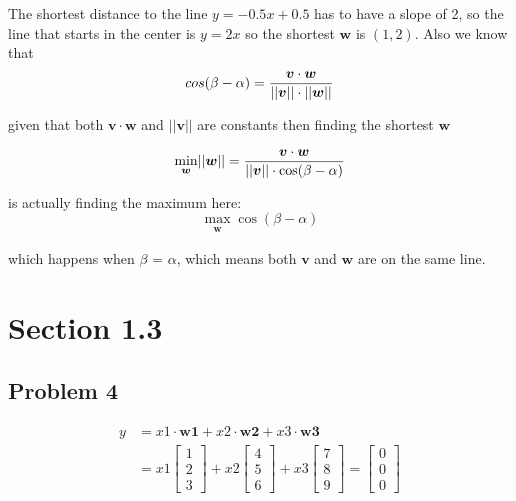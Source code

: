 \documentclass[a4paper,11pt]{article}
\newcommand{\mybf}[1]{\boldsymbol{#1}}
\newcommand{\norm}[1]{\lvert\lvert #1 \rvert\rvert}
\begin{document}
The shortest distance to the line $y=-0.5x+0.5$ has to have a slope of 2, so the line that starts in the center is $y=2x$ so the shortest $\mybf{w}$ is $(1,2)$. Also we know that
\begin{equation}
       cos(\beta-\alpha) = \frac{\mybf{v}\cdot\mybf{w}}{\norm{\mybf{v}}\cdot\norm{\mybf{w}}}\\
\end{equation}

given that both $\mybf{v}\cdot\mybf{w}$ and $\norm{\mybf{v}}$ are constants then finding the shortest $\mybf{w}$

\begin{equation}
	   \min_{\substack{\mybf{w}}}\norm{\mybf{w}} = \frac{\mybf{v}\cdot\mybf{w}}{\norm{\mybf{v}}\cdot\cos(\beta-\alpha)}\\
\end {equation}

is actually finding the maximum here:
\begin{equation}
\max_{\substack{\mybf{w}}}{\cos(\beta-\alpha)}
\end {equation}

which happens when $\beta$ = $\alpha$, which means both $\mybf{v}$ and $\mybf{w}$ are on the same line.

\section*{Section 1.3}
\subsection*{Problem 4}

  \begin{align}
    y &= x1\cdot\mybf{w1}+x2\cdot\mybf{w2}+x3\cdot\mybf{w3} \\
    &=
    	x1
    	\begin{bmatrix}
           1 \\
           2 \\
           3
         \end{bmatrix}
         + 
    	x2
    	\begin{bmatrix}
           4 \\
           5 \\
           6
         \end{bmatrix}
                  + 
    	x3
    	\begin{bmatrix}
           7 \\
           8 \\
           9
         \end{bmatrix}
         =
        \begin{bmatrix}
           0 \\
           0 \\
           0
         \end{bmatrix}
  \end{align}
  
\end{document}
